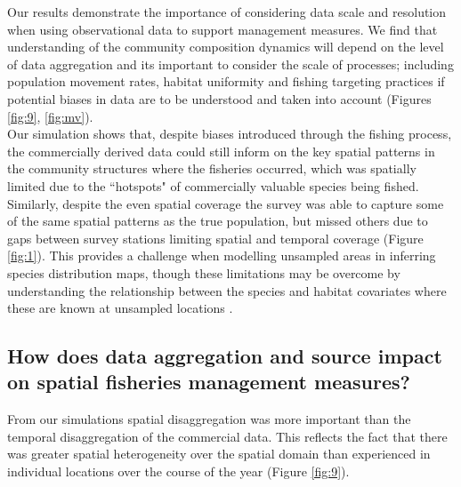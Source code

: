 \documentclass[review]{elsarticle}
\begin{document}
Our results demonstrate the importance of considering data scale and resolution
when using observational data to support management measures. We find that
understanding of the community composition dynamics will depend on the level of
data aggregation and its important to consider the scale of processes;
including population movement rates, habitat uniformity and fishing targeting
practices if potential biases in data are to be understood and taken into
account (Figures \ref{fig:9}, \ref{fig:mv}). \\

Our simulation shows that, despite biases introduced through the fishing
process, the commercially derived data could still inform on the key spatial
patterns in the community structures where the fisheries occurred, which was
spatially limited due to the ``hotspots" of commercially valuable species being
fished. Similarly, despite the even spatial coverage the survey was able to
capture some of the same spatial patterns as the true population, but missed
others due to gaps between survey stations limiting spatial and temporal
coverage (Figure \ref{fig:1}). This provides a challenge when
modelling unsampled areas in inferring species distribution maps, though these
limitations may be overcome by understanding the relationship between the
species and habitat covariates where these are known at unsampled locations
\citep{Robinson2011}. \\ 

\subsection{How does data aggregation and source impact on spatial fisheries
	management measures?}

From our simulations spatial disaggregation was more important than the
temporal disaggregation of the commercial data. This reflects the fact that
there was greater spatial heterogeneity over the spatial domain than
experienced in individual locations over the course of the year (Figure
\ref{fig:9}). \\ 
\end{document}
